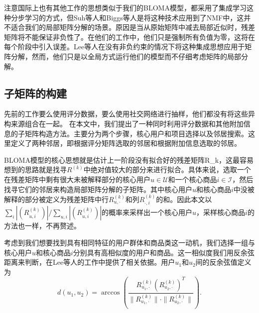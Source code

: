 注意国际上也有其他工作的思想类似于我们的BLOMA模型，都采用了集成学习这种分步学习的方式，但Suh等人和Biggs等人是将这种技术应用到了NMF中，这并不适合我们的局部矩阵分解的场景。原因是当从原始矩阵中减去局部近似时，残差矩阵将不能保证非负性了。在他们的工作中，他们只是强制所有负值为零，这将在每个阶段中引入误差。Lee等人在没有非负约束的情况下将这种集成思想应用于矩阵分解，然而，他们只是以全局方式运行他们的模型而不仔细考虑矩阵的局部分解。

\subsection{子矩阵的构建}
先前的工作要么使用评分数据，要么使用社交网络进行抽样，他们都没有将这些异构来源组合在一起。 在本文中，我们提出了一种同时利用评分数据和其他附加信息的子矩阵构造方法。主要分为两个步骤，核心用户和项目选择以及邻居搜索。这里定义了两种邻居，即根据评分矩阵选取的邻居和根据附加信息选取的邻居。

BLOMA模型的核心思想就是估计上一阶段没有拟合好的残差矩阵\gls{R_k}，这最容易想到的思路就是找寻$R^{(k)}$中绝对值较大的部分来进行拟合。具体来说，选取一个在残差矩阵中剩有很大未被解释部分的核心用户$u \in \mathcal{U}$和一个核心商品$i \in \mathcal{I}$，然后找寻它们的邻居来构造局部矩阵分解的子矩阵。其中核心用户$u$和核心商品$i$中没被解释的部分被定义为残差矩阵中行$R_{u,\cdot}^{(k)}$和列$R_{\cdot,i}^{(k)}$的和。因此本文以$\sum_i|(R_{u,i}^{(k)})|/\sum_{u,i}|(R_{u,i}^{(k)})|$的概率来采样出一个核心用户$u$，采样核心商品$i$的方法也一样，不再赘述。

考虑到我们想要找到具有相同特征的用户群体和商品类这一动机，我们选择一组与核心用户$ u $和核心商品$ i $分别具有高相似度的用户和商品。这一相似度我们用反余弦距离来判断，在Lee等人的工作中提供了相关依据。用户$ u_1 $和$ u_2 $间的反余弦值定义为
\begin{equation}
\label{arc-cosine}
d(u_1,u_2) = \arccos(\frac{R_{u_1,\cdot}^{(k)} (R^{(k)}_{u_2,\cdot})^T}{\|R^{(k)}_{u_1,\cdot}\|\cdot\|R^{(k)}_{u_2,\cdot}\|}).
\end{equation}

